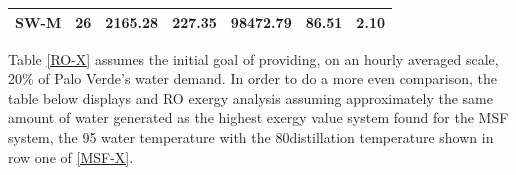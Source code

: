 \documentclass[12pt]{UIdahoMastersThesis}
\begin{document}
\begin{table}[h!]
\begin{tabular}{|l|l|l|l|l|l|l|}
SW-M                                                                                  & 26                                                                                      & 2165.28                                                                                        & 227.35                                                                             & 98472.79                                                                            & 86.51              & 2.10                                                               \\ \hline
\end{tabular}
\end{table}

Table \ref{RO-X} assumes the initial goal of providing, on an hourly averaged scale, 20\% of Palo Verde's water demand. In order to do a more even comparison, the table below displays and RO exergy analysis assuming approximately the same amount of water generated as the highest exergy value system found for the MSF system, the 95 \degree water temperature with the 80\degree distillation temperature shown in row one of \ref{MSF-X}.  
\end{document}
